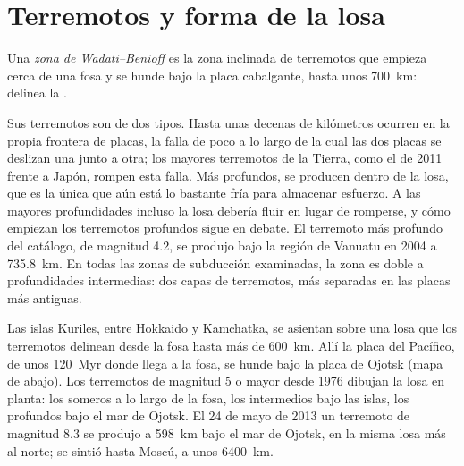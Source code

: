 \section{Terremotos y forma de la losa}\label{sec:b1:active-margins:seismicity}

\begin{definition}\label{def:b1:active-margins:wadati-benioff}
Una \emph{zona de Wadati--Benioff} es la zona inclinada de terremotos que empieza cerca de una fosa y se hunde
bajo la placa cabalgante, hasta unos \qty{700}{km}: delinea la .
\end{definition}

Sus terremotos son de dos tipos. Hasta unas decenas de kilómetros ocurren en la propia frontera de placas, la falla de poco  a lo
largo de la cual las dos placas se deslizan una junto a otra; los mayores terremotos de la Tierra, como el de 2011 frente a Japón, rompen esta
falla. Más profundos, se producen dentro de la losa, que es la única que aún está lo bastante fría para almacenar esfuerzo. A las mayores
profundidades incluso la losa debería fluir en lugar de romperse, y cómo empiezan los terremotos profundos sigue en debate. El terremoto más
profundo del catálogo, de magnitud 4.2, se produjo bajo la región de Vanuatu en 2004 a \qty{735.8}{km}. En todas las zonas de subducción
examinadas, la zona es doble a profundidades intermedias: dos capas de terremotos, más separadas en las placas más antiguas.

Las islas Kuriles, entre Hokkaido y Kamchatka, se asientan sobre una losa que los terremotos delinean desde la fosa hasta más de \qty{600}{km}.
Allí la placa del Pacífico, de unos \qty{120}{Myr} donde llega a la fosa, se hunde bajo la placa de Ojotsk (mapa de abajo). Los terremotos de
magnitud 5 o mayor desde 1976 dibujan la losa en planta: los someros a lo largo de la fosa, los intermedios bajo las islas, los profundos bajo el
mar de Ojotsk. El 24 de mayo de 2013 un terremoto de magnitud 8.3 se produjo a \qty{598}{km} bajo el mar de Ojotsk, en la misma losa más al norte;
se sintió hasta Moscú, a unos \qty{6400}{km}.

